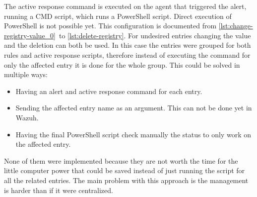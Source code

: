 \linej
\linej
The active response command is executed on the agent that triggered the alert, running a CMD script, which runs a PowerShell script.
Direct execution of PowerShell is not possible yet.
This configuration is documented from \ref{lst:change-registry-value_0}\ to \ref{lst:delete-registry}.
For undesired entries changing the value and the deletion can both be used.
\linej
\linej
In this case the entries were grouped for both rules and active response scripts, therefore instead of executing the command for only the affected entry it is done for the whole group.
This could be solved in multiple ways:
\begin{itemize}
	\item Having an alert and active response command for each entry.
	\item Sending the affected entry name as an argument. This can not be done yet in Wazuh.
	\item Having the final PowerShell script check manually the status to only work on the affected entry.
\end{itemize}
\linej
None of them were implemented because they are not worth the time for the little computer power that could be saved instead of just running the script for all the related entries.
The main problem with this approach is the management is harder than if it were centralized.

